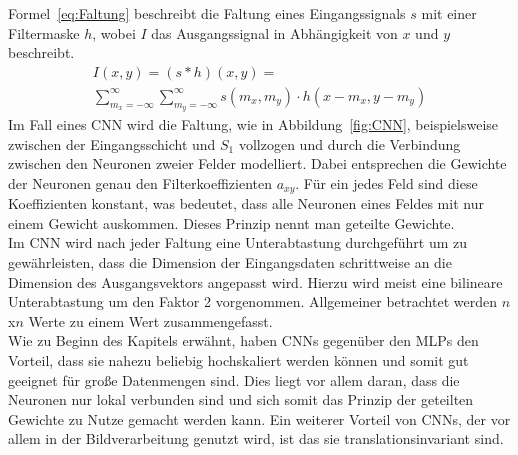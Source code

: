 \documentclass[times, 11pt,twocolumn]{article}
\begin{document}
\small  
Formel~\ref{eq:Faltung} beschreibt die Faltung eines Eingangssignals $s$ mit einer Filtermaske $h$, wobei $I$ das Ausgangssignal in Abhängigkeit von $x$ und $y$ beschreibt.
\footnotesize
\begin{equation}
\begin{aligned}
I(x,y) = (s*h)(x,y) = \\
\sum_{m_x=-\infty}^\infty \sum_{m_y=-\infty}^\infty s(m_x,m_y) \cdot h(x-m_x,y-m_y) 
\end{aligned}
	\label{eq:Faltung}
\end{equation}
\small
Im Fall eines CNN wird die Faltung, wie in Abbildung~\ref{fig:CNN}, beispielsweise zwischen der Eingangsschicht und $S_1$ vollzogen und durch die Verbindung zwischen den Neuronen zweier Felder modelliert. Dabei entsprechen die Gewichte der Neuronen genau den Filterkoeffizienten $a_{xy}$. Für ein jedes Feld sind diese Koeffizienten konstant, was bedeutet, dass alle Neuronen eines Feldes mit nur einem Gewicht auskommen. Dieses Prinzip nennt man geteilte Gewichte. \\
Im CNN wird nach jeder Faltung eine Unterabtastung durchgeführt um zu gewährleisten, dass die Dimension der Eingangsdaten schrittweise an die Dimension des Ausgangsvektors angepasst wird. Hierzu wird meist eine bilineare Unterabtastung um den Faktor 2 vorgenommen. Allgemeiner betrachtet werden $n$x$n$ Werte zu einem Wert zusammengefasst.\\
Wie zu Beginn des Kapitels erwähnt, haben CNNs gegenüber den MLPs den Vorteil, dass sie nahezu beliebig hochskaliert werden können und somit gut geeignet für große Datenmengen sind. Dies liegt vor allem daran, dass die Neuronen nur lokal verbunden sind und sich somit das Prinzip der geteilten Gewichte zu Nutze gemacht werden kann. Ein weiterer Vorteil von CNNs, der vor allem in der Bildverarbeitung genutzt wird, ist das sie translationsinvariant sind.
\end{document}
